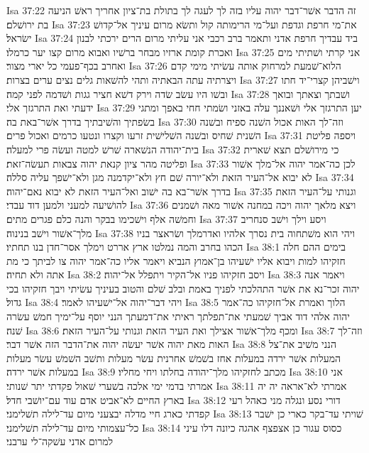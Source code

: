 Isa 37:22  זה הדבר אשׁר־דבר יהוה עליו בזה לך לעגה לך בתולת בת־ציון אחריך ראשׁ הניעה בת ירושׁלם׃
Isa 37:23  את־מי חרפת וגדפת ועל־מי הרימותה קול ותשׂא מרום עיניך אל־קדושׁ ישׂראל׃
Isa 37:24  ביד עבדיך חרפת אדני ותאמר ברב רכבי אני עליתי מרום הרים ירכתי לבנון ואכרת קומת ארזיו מבחר ברשׁיו ואבוא מרום קצו יער כרמלו׃
Isa 37:25  אני קרתי ושׁתיתי מים ואחרב בכף־פעמי כל יארי מצור׃
Isa 37:26  הלוא־שׁמעת למרחוק אותה עשׂיתי מימי קדם ויצרתיה עתה הבאתיה ותהי להשׁאות גלים נצים ערים בצרות׃
Isa 37:27  וישׁביהן קצרי־יד חתו ובשׁו היו עשׂב שׂדה וירק דשׁא חציר גגות ושׁדמה לפני קמה׃
Isa 37:28  ושׁבתך וצאתך ובואך ידעתי ואת התרגזך אלי׃
Isa 37:29  יען התרגזך אלי ושׁאננך עלה באזני ושׂמתי חחי באפך ומתגי בשׂפתיך והשׁיבתיך בדרך אשׁר־באת בה׃
Isa 37:30  וזה־לך האות אכול השׁנה ספיח ובשׁנה השׁנית שׁחיס ובשׁנה השׁלישׁית זרעו וקצרו ונטעו כרמים ואכול פרים׃
Isa 37:31  ויספה פליטת בית־יהודה הנשׁארה שׁרשׁ למטה ועשׂה פרי למעלה׃
Isa 37:32  כי מירושׁלם תצא שׁארית ופליטה מהר ציון קנאת יהוה צבאות תעשׂה־זאת׃
Isa 37:33  לכן כה־אמר יהוה אל־מלך אשׁור לא יבוא אל־העיר הזאת ולא־יורה שׁם חץ ולא־יקדמנה מגן ולא־ישׁפך עליה סללה׃
Isa 37:34  בדרך אשׁר־בא בה ישׁוב ואל־העיר הזאת לא יבוא נאם־יהוה׃
Isa 37:35  וגנותי על־העיר הזאת להושׁיעה למעני ולמען דוד עבדי׃
Isa 37:36  ויצא מלאך יהוה ויכה במחנה אשׁור מאה ושׁמנים וחמשׁה אלף וישׁכימו בבקר והנה כלם פגרים מתים׃
Isa 37:37  ויסע וילך וישׁב סנחריב מלך־אשׁור וישׁב בנינוה׃
Isa 37:38  ויהי הוא משׁתחוה בית נסרך אלהיו ואדרמלך ושׂראצר בניו הכהו בחרב והמה נמלטו ארץ אררט וימלך אסר־חדן בנו תחתיו׃
Isa 38:1  בימים ההם חלה חזקיהו למות ויבוא אליו ישׁעיהו בן־אמוץ הנביא ויאמר אליו כה־אמר יהוה צו לביתך כי מת אתה ולא תחיה׃
Isa 38:2  ויסב חזקיהו פניו אל־הקיר ויתפלל אל־יהוה׃
Isa 38:3  ויאמר אנה יהוה זכר־נא את אשׁר התהלכתי לפניך באמת ובלב שׁלם והטוב בעיניך עשׂיתי ויבך חזקיהו בכי גדול׃
Isa 38:4  ויהי דבר־יהוה אל־ישׁעיהו לאמר׃
Isa 38:5  הלוך ואמרת אל־חזקיהו כה־אמר יהוה אלהי דוד אביך שׁמעתי את־תפלתך ראיתי את־דמעתך הנני יוסף על־ימיך חמשׁ עשׂרה שׁנה׃
Isa 38:6  ומכף מלך־אשׁור אצילך ואת העיר הזאת וגנותי על־העיר הזאת׃
Isa 38:7  וזה־לך האות מאת יהוה אשׁר יעשׂה יהוה את־הדבר הזה אשׁר דבר׃
Isa 38:8  הנני משׁיב את־צל המעלות אשׁר ירדה במעלות אחז בשׁמשׁ אחרנית עשׂר מעלות ותשׁב השׁמשׁ עשׂר מעלות במעלות אשׁר ירדה׃
Isa 38:9  מכתב לחזקיהו מלך־יהודה בחלתו ויחי מחליו׃
Isa 38:10  אני אמרתי בדמי ימי אלכה בשׁערי שׁאול פקדתי יתר שׁנותי׃
Isa 38:11  אמרתי לא־אראה יה יה בארץ החיים לא־אביט אדם עוד עם־יושׁבי חדל׃
Isa 38:12  דורי נסע ונגלה מני כאהל רעי קפדתי כארג חיי מדלה יבצעני מיום עד־לילה תשׁלימני׃
Isa 38:13  שׁויתי עד־בקר כארי כן ישׁבר כל־עצמותי מיום עד־לילה תשׁלימני׃
Isa 38:14  כסוס עגור כן אצפצף אהגה כיונה דלו עיני למרום אדני עשׁקה־לי ערבני׃
